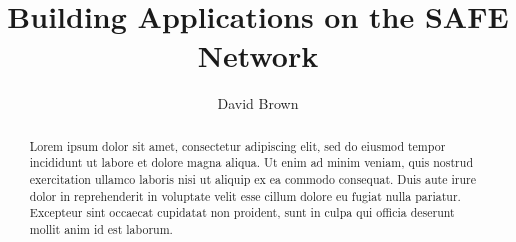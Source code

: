 \documentclass{l4proj}
\begin{document}
\title{Building Applications on the SAFE Network}	
\author{David Brown}
\maketitle

\begin{abstract}
Lorem ipsum dolor sit amet, consectetur adipiscing elit, sed do eiusmod tempor incididunt ut labore et dolore magna aliqua. Ut enim ad minim veniam, quis nostrud exercitation ullamco laboris nisi ut aliquip ex ea commodo consequat. Duis aute irure dolor in reprehenderit in voluptate velit esse cillum dolore eu fugiat nulla pariatur. Excepteur sint occaecat cupidatat non proident, sunt in culpa qui officia deserunt mollit anim id est laborum.
\end{abstract}

\educationalconsent

\tableofcontents








\printbibliography
\end{document}
